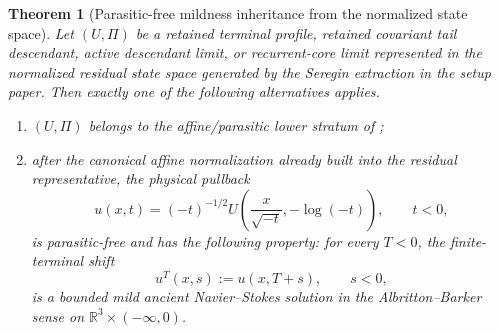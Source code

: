 \documentclass[11pt]{amsart}
\numberwithin{equation}{section}
\theoremstyle{plain}
\newtheorem{theorem}{Theorem}[section]
\theoremstyle{definition}
\theoremstyle{remark}
\begin{document}
\begin{theorem}[Parasitic-free mildness inheritance from the normalized state space]
\label{hyp:mildness-inheritance-main}
\label{thm:mildness-inheritance-main}
\label{thm:parasitic-free-mildness}
Let \((U,\Pi)\) be a retained terminal profile, retained covariant tail
descendant, active descendant limit, or recurrent-core limit represented in the
normalized residual state space generated by the Seregin extraction in the
setup paper.
Then exactly one of the following alternatives applies.
\begin{enumerate}[label=\textup{(\roman*)}]
   \item \((U,\Pi)\) belongs to the affine/parasitic lower stratum of
   ;
   \item after the canonical affine normalization already built into the
   residual representative, the physical pullback
\[
   u(x,t)=(-t)^{-1/2}
   U\!\left(\frac{x}{\sqrt{-t}},-\log(-t)\right),
   \qquad t<0,
\]
is parasitic-free and has the following property: for every \(T<0\), the
finite-terminal shift
\[
   u^T(x,s):=u(x,T+s),\qquad s<0,
\]
is a bounded mild ancient Navier--Stokes solution in the Albritton--Barker
sense on \(\mathbb R^3\times(-\infty,0)\).
\end{enumerate}
\end{theorem}
\end{document}
